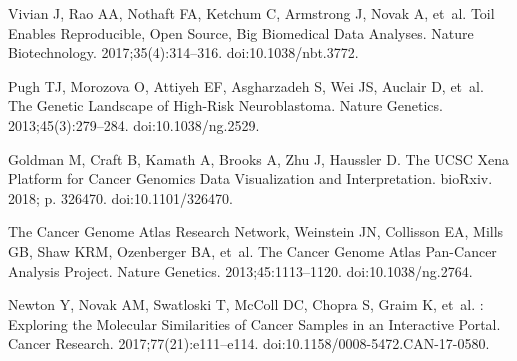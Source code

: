 \documentclass[10pt,letterpaper]{article}
\begin{document}
\begin{thebibliography}{10}

Vivian J, Rao AA, Nothaft FA, Ketchum C, Armstrong J, Novak A, et~al.
\newblock Toil Enables Reproducible, Open Source, Big Biomedical Data Analyses.
\newblock Nature Biotechnology. 2017;35(4):314--316.
\newblock doi:{10.1038/nbt.3772}.

Pugh TJ, Morozova O, Attiyeh EF, Asgharzadeh S, Wei JS, Auclair D, et~al.
\newblock The Genetic Landscape of High-Risk Neuroblastoma.
\newblock Nature Genetics. 2013;45(3):279--284.
\newblock doi:{10.1038/ng.2529}.

Goldman M, Craft B, Kamath A, Brooks A, Zhu J, Haussler D.
\newblock The {{UCSC Xena Platform}} for Cancer Genomics Data Visualization and
Interpretation.
\newblock bioRxiv. 2018; p. 326470.
\newblock doi:{10.1101/326470}.

{The Cancer Genome Atlas Research Network}, Weinstein JN, Collisson EA, Mills
GB, Shaw KRM, Ozenberger BA, et~al.
\newblock The {{Cancer Genome Atlas Pan}}-{{Cancer}} Analysis Project.
\newblock Nature Genetics. 2013;45:1113--1120.
\newblock doi:{10.1038/ng.2764}.

Newton Y, Novak AM, Swatloski T, McColl DC, Chopra S, Graim K, et~al.
: {{Exploring}} the {{Molecular Similarities}} of
{{Cancer Samples}} in an {{Interactive Portal}}.
\newblock Cancer Research. 2017;77(21):e111--e114.
\newblock doi:{10.1158/0008-5472.CAN-17-0580}.


\end{thebibliography}
\end{document}
